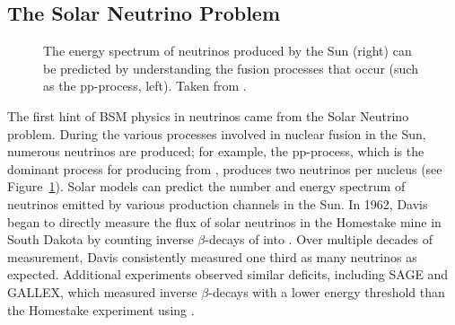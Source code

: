 \documentclass[/main.tex]{subfiles}
\begin{document}
\subsection{The Solar Neutrino Problem}
\begin{figure}[t]
  \centering
  \caption[Neutrinos produced by Solar fusion]{\label{fig:ppproc}
    The energy spectrum of neutrinos produced by the Sun (right) can be predicted by understanding the fusion processes that occur (such as the pp-process, left). Taken from \cite{PDG2018}.
  }
\end{figure}
The first hint of BSM physics in neutrinos came from the Solar Neutrino problem.
During the various processes involved in nuclear fusion in the Sun, numerous neutrinos are produced; for example, the pp-process, which is the dominant process for producing  from , produces two neutrinos per  nucleus (see Figure~\ref{fig:ppproc}).
Solar models can predict the number and energy spectrum of neutrinos emitted by various production channels in the Sun\cite{Bahcall2005}.
In 1962, Davis began to directly measure the flux of solar neutrinos in the Homestake mine in South Dakota by counting inverse $\beta$-decays of  into .
Over multiple decades of measurement, Davis consistently measured one third as many neutrinos as expected\cite{Cleveland1998}.
Additional experiments observed similar deficits, including SAGE and GALLEX, which measured inverse $\beta$-decays with a lower energy threshold than the Homestake experiment using \cite{SageGallex1999}.
\end{document}
